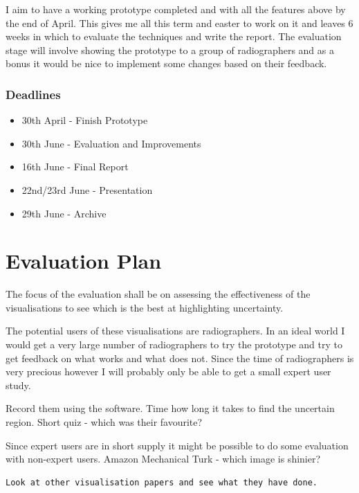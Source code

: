 \documentclass[
  oneside,
  11pt, a4paper,
  footinclude=true,
  headinclude=true,
  cleardoublepage=empty
]{scrbook}
\begin{document}
I aim to have a working prototype completed and with all the features above by the end of April. This gives me all this term and easter to work on it and leaves 6 weeks in which to evaluate the techniques and write the report. The evaluation stage will involve showing the prototype to a group of radiographers and as a bonus it would be nice to implement some changes based on their feedback.

\subsection*{Deadlines}
\begin{itemize}
	\item[] 30th April - Finish Prototype
	\item[] 30th June - Evaluation and Improvements
	\item[] 16th June - Final Report
	\item[] 22nd/23rd June - Presentation
	\item[] 29th June - Archive
\end{itemize}

\chapter{Evaluation Plan}
The focus of the evaluation shall be on assessing the effectiveness of the visualisations to see which is the best at highlighting uncertainty.

The potential users of these visualisations are radiographers. In an ideal world I would get a very large number of radiographers to try the prototype and try to get feedback on what works and what does not. Since the time of radiographers is very precious however I will probably only be able to get a small expert user study.

Record them using the software.
Time how long it takes to find the uncertain region.
Short quiz - which was their favourite?

Since expert users are in short supply it might be possible to do some evaluation with non-expert users. Amazon Mechanical Turk - which image is shinier?

\begin{verbatim}
Look at other visualisation papers and see what they have done.
\end{verbatim}


 

    
\end{document}
